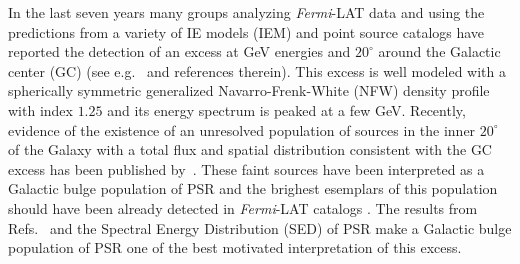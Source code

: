 \documentclass[12pt,twoside,letterpaper,onecolumn,english]{article}
\begin{document}


In the last seven years many groups analyzing
{\it Fermi}-LAT data and using  the predictions from a variety of IE models (IEM)
and point source catalogs have reported the detection of an excess at GeV
energies and $20^{\circ}$ around the Galactic center (GC) (see e.g.~\cite{TheFermi-LAT:2015kwa} and references therein).
This excess is well modeled with a spherically symmetric generalized
Navarro-Frenk-White (NFW) density profile with index $1.25$ and its
energy spectrum is peaked at a few GeV.
Recently, evidence of the existence of an unresolved population of
sources in the inner $20^\circ$ of the Galaxy with a total flux and spatial
distribution consistent with the GC excess has been published
by~\cite{Bartels:2015aea,Lee:2014mza}. These faint sources have been
interpreted as a Galactic bulge population of PSR and the brighest esemplars of this population 
should have been already detected in {\it Fermi}-LAT catalogs \cite{Cholis:2014lta}.  
The results from Refs.~\cite{Bartels:2015aea,Lee:2014mza} and the Spectral Energy Distribution (SED) 
of PSR make a Galactic bulge population of PSR one of the best motivated interpretation of this excess.
\end{document}

